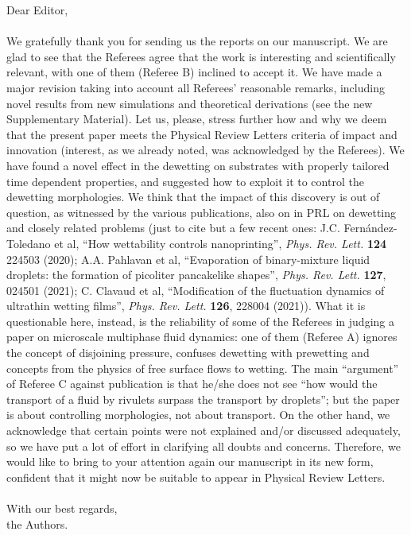 \documentclass[12pt,english]{article}
\begin{document}
\noindent Dear Editor,\\
\\
\noindent We gratefully thank you for sending us the reports on our manuscript. We are glad to see 
that the Referees agree that the work is interesting and scientifically relevant, with one of them 
(Referee B) inclined to accept it. 
We have made a major revision taking into account all Referees' reasonable remarks, including novel 
results from new simulations and theoretical derivations (see the new Supplementary Material).
Let us, please, stress further how and why we deem that the present paper meets the Physical
Review Letters criteria of impact and innovation (interest, as we already noted, was acknowledged by the Referees).
We have found a novel effect in the dewetting on substrates with properly tailored time dependent properties, and 
suggested how to exploit it to control the dewetting morphologies. 
We think that the impact of this discovery is out of question, as witnessed by the various publications, also on in PRL on dewetting and closely related problems
(just to cite but a few recent ones: J.C. Fern\'andez-Toledano et al, ``How wettability controls nanoprinting'',
{\it Phys. Rev. Lett.} {\bf 124} 224503 (2020); A.A. Pahlavan et al,
``Evaporation of binary-mixture liquid droplets: the formation of picoliter pancakelike shapes'', {\it Phys. Rev. Lett.} {\bf 127}, 024501 (2021); 
C. Clavaud et al, ``Modification of the fluctuation dynamics of ultrathin wetting films'', {\it Phys. Rev. Lett.} {\bf 126}, 228004 (2021)).
What it is questionable here, instead, is the reliability of some of the Referees in judging a paper on microscale multiphase fluid dynamics: one of 
them (Referee A) ignores the concept of disjoining pressure, confuses dewetting with prewetting and concepts from the physics of free surface flows to wetting.
The main ``argument'' of Referee C against publication is that he/she does not see ``how would the transport of a fluid by rivulets 
surpass the transport by droplets''; but the paper is about controlling morphologies, not about transport.
On the other hand, we acknowledge that certain points were not explained and/or discussed adequately, so we have put a lot of effort in clarifying all
doubts and concerns. 
Therefore, we would like to bring to your attention again our manuscript in its new form, confident that it might now be suitable to appear in Physical Review Letters.\\
\\
With our best regards,\\
the Authors.
\end{document}
